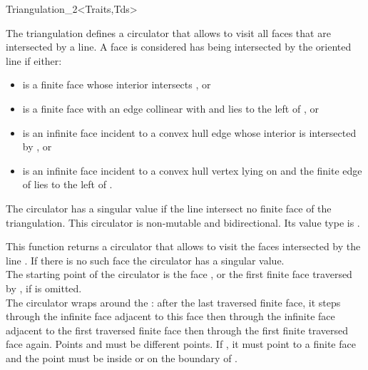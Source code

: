 \begin{ccRefClass}{Triangulation_2<Traits,Tds>}
\ccGlue
{}

\ccGlue
{}


The triangulation defines a circulator that allows
to visit all faces that are intersected by a line. 
A  face   is 
considered has being intersected by 
 the oriented line  if either:
\begin{itemize}\ccTexHtml{\itemsep0pt}{}
\item 
{} is a finite face whose interior intersects , or
\item
  is a finite face with  an edge collinear with  and lies
to the left of , or
\item
{} is an infinite face incident to a  convex hull edge 
whose interior is intersected
by , or
\item
{} is an infinite face incident to a  convex hull vertex
lying on   and the finite edge of 
lies to the left of . 
\end{itemize}
The circulator has a singular value if  the line 
intersect no finite face of the triangulation.
This circulator is
non-mutable and bidirectional. Its value type is .

{ This function returns a circulator that allows to visit the 
 faces intersected by the line . 
If there is no such face the circulator has a singular value.\\
 The starting point of the circulator is the face , or
 the first finite face traversed by  , if
  is omitted. \\
  The circulator wraps around the  :
after the last traversed finite face, it steps through the infinite face adjacent
to this face then through the infinite face adjacent to the first
traversed finite face then through the first finite traversed face
again.
\ccPrecond Points  and  must be different points.
\ccPrecond If , it must point to a finite face
 and the point  must be
inside or on the boundary of .}


\end{ccRefClass}
